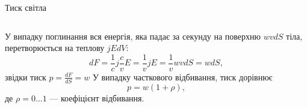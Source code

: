\documentclass[onlytextwidth]{beamer}
\begin{document}
\begin{frame}{Тиск світла}{}
\begin{columns}
\begin{column}{0.6\linewidth}
\begin{block}{}
				\begin{overprint}
					У випадку поглинання вся енергія, яка падає за секунду на поверхню $wv dS$ тіла, перетворюється на теплову $ jE dV $:
					\begin{equation*}
						dF = \frac1c j \frac{c}{v}E = \frac1vjE = \frac1v wvdS = w dS,
					\end{equation*}
					звідки тиск $ p = \frac{dF}{dS} = w $
					\onslide<2>
					У випадку часткового відбивання, тиск дорівнює
					\begin{equation*}
						p = w (1 + \rho),
					\end{equation*}
					де $ \rho = 0 \ldots 1$ --- коефіцієнт відбивання.
				\end{overprint}
			\end{block}
		\end{column}
	\end{columns}
\end{frame}
\end{document}
